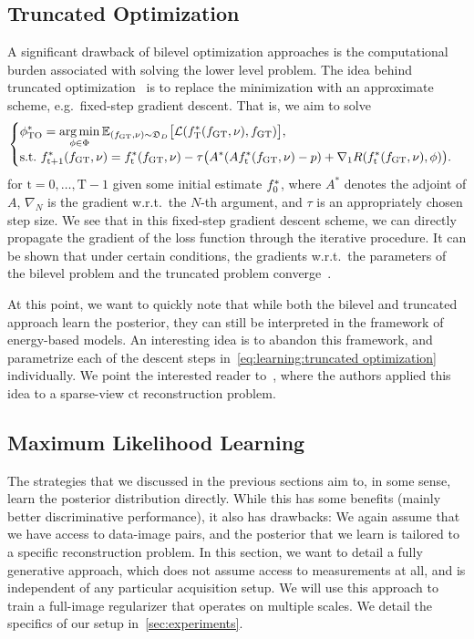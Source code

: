 \documentclass[../ml-ct.tex]{subfiles}
\begin{document}
\subsection{Truncated Optimization}
A significant drawback of bilevel optimization approaches is the computational burden associated with solving the lower level problem.
The idea behind truncated optimization~\cite{barbu_training_2009,domke_generic_2012} is to replace the minimization with an approximate scheme, e.g.\ fixed-step gradient descent.
That is, we aim to solve
\begin{equation}
	\begin{cases}
		\displaystyle \optimal{\params}{TO} = \argmin_{\params \in \Phi} \mathbb{E}_{(f_\text{GT}, \nu) \sim \distr{D}} \bigl[ \mathcal{L}(\optimal{f}{T}(f_\text{GT}, \nu), f_\text{GT}) \bigr], \\
		\displaystyle \st\ \optimal{f}{t+1}(f_\text{GT}, \nu) = \optimal{f}{t}(f_\text{GT}, \nu) -\tau \bigl(A^*(A\optimal{f}{t}(f_\text{GT}, \nu) - p) + \nabla_1 R(\optimal{f}{t}(f_\text{GT}, \nu), \params)\bigr).
	\end{cases}%
	\label{eq:learning:truncated optimization}
\end{equation}
for \( \text{t} = 0, \dotsc, \text{T} - 1 \) given some initial estimate \( f^*_{\text{0}} \), where \( A^* \) denotes the adjoint of \( A \), \( \nabla_N \) is the gradient w.r.t.\ the \(N\)-th argument, and \( \tau \) is an appropriately chosen step size.
We see that in this fixed-step gradient descent scheme, we can directly propagate the gradient of the loss function through the iterative procedure.
It can be shown that under certain conditions, the gradients w.r.t.\ the parameters of the bilevel problem and the truncated problem converge~\cite{mehmood_automatic_2020}.

At this point, we want to quickly note that while both the bilevel and truncated approach learn the posterior, they can still be interpreted in the framework of energy-based models.
An interesting idea is to abandon this framework, and parametrize each of the descent steps in~\cref{eq:learning:truncated optimization} individually.
We point the interested reader to~\cite{chen_learn_2018}, where the authors applied this idea to a sparse-view \gls{ct} reconstruction problem.
\subsection{Maximum Likelihood Learning}
The strategies that we discussed in the previous sections aim to, in some sense, learn the posterior distribution directly.
While this has some benefits (mainly better discriminative performance), it also has drawbacks:
We again assume that we have access to data-image pairs, and the posterior that we learn is tailored to a specific reconstruction problem.
In this section, we want to detail a fully generative approach, which does not assume access to measurements at all, and is independent of any particular acquisition setup.
We will use this approach to train a full-image regularizer that operates on multiple scales.
We detail the specifics of our setup in~\cref{sec:experiments}.
\end{document}
